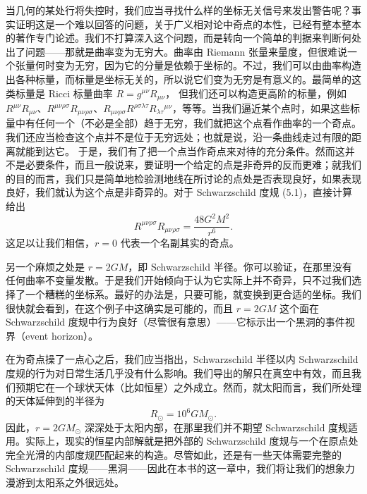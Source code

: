 当几何的某处行将失控时，我们应当寻找什么样的坐标无关信号来发出警告呢？事实证明这是一个难以回答的问题，关于广义相对论中奇点的本性，已经有整本整本的著作专门论述。我们不打算深入这个问题，而是转向一个简单的判据来判断何处出了问题——那就是曲率变为无穷大。曲率由 Riemann 张量来量度，但很难说一个张量何时变为无穷，因为它的分量是依赖于坐标的。不过，我们可以由曲率构造出各种标量，而标量是坐标无关的，所以说它们变为无穷是有意义的。最简单的这类标量是 Ricci 标量曲率 $R = g^{\mu\nu}R_{\mu\nu}$，
但我们还可以构造更高阶的标量，例如 $R^{\mu\nu}R_{\mu\nu}$、$R^{\mu\nu\rho\sigma}R_{\mu\nu\rho\sigma}$、$R_{\mu\nu\rho\sigma}R^{\rho\sigma\lambda\tau}R_{\lambda\tau}{}^{\mu\nu}$，等等。当我们逼近某个点时，如果这些标量中有任何一个（不必是全部）趋于无穷，我们就把这个点看作曲率的一个奇点。我们还应当检查这个点并不是位于无穷远处；也就是说，沿一条曲线走过有限的距离就能到达它。
于是，我们有了把一个点当作奇点来对待的充分条件。然而这并不是必要条件，而且一般说来，要证明一个给定的点是非奇异的反而更难；就我们的目的而言，我们只是简单地检验测地线在所讨论的点处是否表现良好，如果表现良好，我们就认为这个点是非奇异的。对于 Schwarzschild 度规 (5.1)，直接计算给出
\begin{equation*}
R^{\mu\nu\rho\sigma}R_{\mu\nu\rho\sigma} = \frac{48G^2M^2}{r^6}.
\tag{5.50}
\end{equation*}
这足以让我们相信，$r = 0$ 代表一个名副其实的奇点。

另一个麻烦之处是 $r = 2GM$，即 Schwarzschild 半径。你可以验证，在那里没有任何曲率不变量发散。于是我们开始倾向于认为它实际上并不奇异，只不过我们选择了一个糟糕的坐标系。最好的办法是，只要可能，就变换到更合适的坐标。我们很快就会看到，在这个例子中这确实是可能的，而且 $r = 2GM$ 这个面在 Schwarzschild 度规中行为良好（尽管很有意思）——它标示出一个黑洞的事件视界（event horizon）。

在为奇点操了一点心之后，我们应当指出，Schwarzschild 半径以内 Schwarzschild 度规的行为对日常生活几乎没有什么影响。我们导出的解只在真空中有效，而且我们预期它在一个球状天体（比如恒星）之外成立。然而，就太阳而言，我们所处理的天体延伸到的半径为
\begin{equation*}
R_\odot = 10^6 GM_\odot.
\tag{5.51}
\end{equation*}
因此，$r = 2GM_\odot$ 深深处于太阳内部，在那里我们并不期望 Schwarzschild 度规适用。实际上，现实的恒星内部解就是把外部的 Schwarzschild 度规与一个在原点处完全光滑的内部度规匹配起来的构造。尽管如此，还是有一些天体需要完整的 Schwarzschild 度规——黑洞——因此在本书的这一章中，我们将让我们的想象力漫游到太阳系之外很远处。

